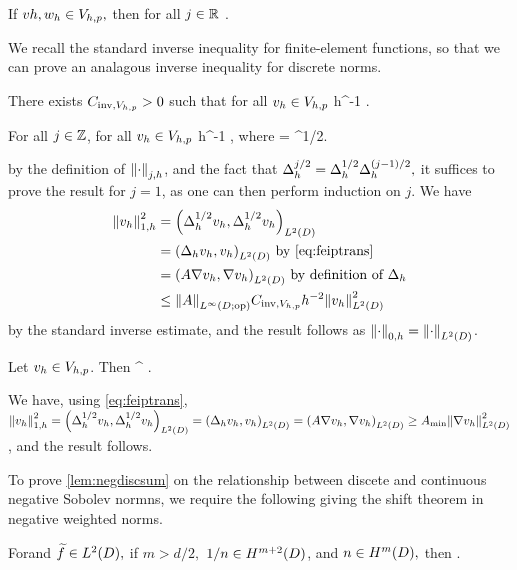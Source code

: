 \label{cor:ipdiscbound}
If $vh, w_{h} \in V_{h,p},$ then for all $j \in \mathbb R$
\beqs
\IPLtD{\vh}{\wh} \leq \Njh{\vh}\Nmjh{\wh}.
\eeqs
\eco

We recall the standard inverse inequality for finite-element functions, so that we can prove an analagous inverse inequality for discrete norms.

\label{lem:inverseinequality}
There exists $C_{\mathrm{inv},V_{h,p}} > 0$ such that for all $v_{h} \in V_{h,p}$
\beqs
\NHoD{\vh} \leq \CinvVhp h^{-1} \NLtD{\vh}.
\eeqs
\ele



\label{lem:inversediscrete}
For all $j \in \mathbb Z$, for all $v_{h} \in V_{h,p}$
\beqs
\Njh{\vh} \leq \Chinv h^{-1} \Njmoh{\vh},
\eeqs
where
\beqs
\Chinv = \CinvVhp {}^{1/2}.
\eeqs
\ele

by the definition of $\Njh{\cdot}$, and the fact that $\Delta_{h}^{j/2} = \Delta_{h}^{1/2}\Delta_{h}^{(j-1)/2},$ it suffices to prove the result for $j=1$, as one can then perform induction on $j$. We have
\begin{align*}
\Noh{\vh}^2 &= \IPLtD{\Deltahh \vh}{\Deltahh \vh}\\
&= \IPLtD{\Deltah \vh}{\vh} \text{ by \cref{eq:feiptrans}}\\
&= \IPLtD{A \grad \vh}{\grad \vh} \text{ by definition of } \Deltah\\
&\leq \NLiDop{A} \CinvVhp h^{-2} \NLtD{\vh}^2
\end{align*}
by the standard inverse estimate, and the result follows as $\Nzh{\cdot} = \NLtD{\cdot}$.
\epf

\label{lem:h1contdisc}
Let $v_{h} \in V_{h,p}$. Then
\beqs
\SNHoD{\vh} \leq \Amin^{\half} \Noh{\vh}.
\eeqs
\ele

We have, using \cref{eq:feiptrans}, $\Noh{\vh}^2 = \IPLtD{\Deltahh \vh}{\Deltahh \vh} = \IPLtD{\Deltah \vh}{\vh}= \IPLtD{A \grad \vh}{\grad \vh} \geq \Amin \NLtD{\grad \vh}^2$, and the result follows.
\epf



To prove \cref{lem:negdiscsum} on the relationship between discete and continuous negative Sobolev normns, we require the following  giving the shift theorem in negative weighted norms.

\label{lem:shiftnegativew}
Forand $\ftilde \in \LtD,$ if $m > d/2,$ $1/n \in \Hfn{}{m+2}{D}$, and $n \in \HmD,$ then
\beqs
{} \leq {} .
\eeqs
\ele

